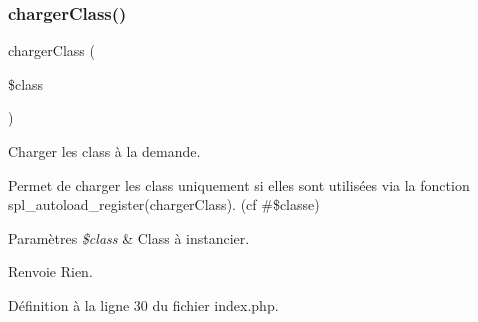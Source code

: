 \subsubsection{\texorpdfstring{charger\+Class()}{chargerClass()}}
{\footnotesize\ttfamily charger\+Class (\begin{DoxyParamCaption}\item[{}]{\$class }\end{DoxyParamCaption})}



Charger les class à la demande. 

Permet de charger les class uniquement si elles sont utilisées via la fonction spl\+\_\+autoload\+\_\+register(\textquotesingle{}charger\+Class\textquotesingle{}). (cf \#\$classe) 
\begin{DoxyParams}{Paramètres}
{\em \$class} & Class à instancier. \\
\hline
\end{DoxyParams}
\begin{DoxyReturn}{Renvoie}
Rien. 
\end{DoxyReturn}


Définition à la ligne 30 du fichier index.\+php.

